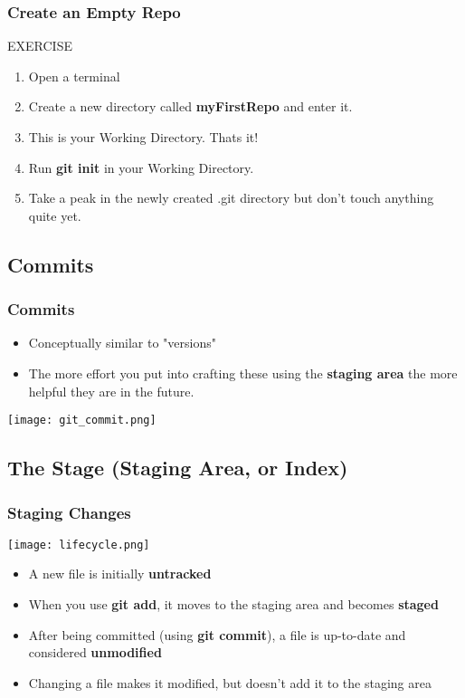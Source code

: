 \documentclass{beamer}
\begin{document}
\begin{frame}[fragile]
\frametitle{Create an Empty Repo}
    \begin{block}{EXERCISE}
        \begin{enumerate}
        \item Open a terminal
        \item Create a new directory called \textbf{myFirstRepo} and enter it.
	 \item This is your Working Directory. Thats it!
	 \item Run \textbf{git init} in your Working Directory.
        \item Take a peak in the newly created .git directory but don't touch anything quite yet.
        \end{enumerate}
    \end{block}

\end{frame}

\subsection{Commits}

\begin{frame}[fragile]
\frametitle{Commits}
\begin{itemize}
\item Conceptually similar to "versions"
\item The more effort you put into crafting these using the \textbf{staging area} the more helpful they are in the future.
\end{itemize}
\texttt{[image: git\_commit.png]}
\end{frame}

\subsection{The Stage (Staging Area, or Index)}

\begin{frame}
\frametitle{Staging Changes}
\begin{center}
\texttt{[image: lifecycle.png]}
\end{center}
\begin{itemize}
\item A new file is initially \textbf{untracked}
\item When you use \textbf{git add}, it moves to the staging area and becomes \textbf{staged}
\item After being committed (using \textbf{git commit}), a file is up-to-date and considered \textbf{unmodified}
\item Changing a file makes it modified, but doesn't add it to the staging area
\end{itemize}
\end{frame}
\end{document}
